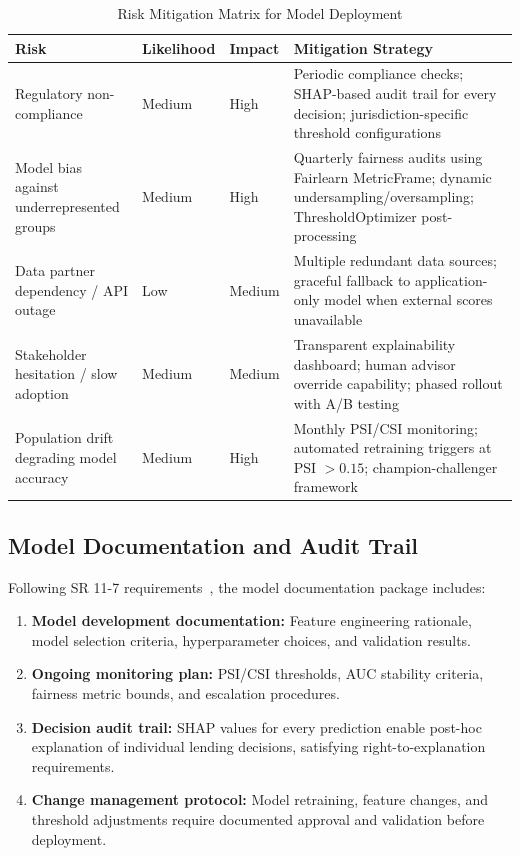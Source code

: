 \begin{table}[H]
\centering
\caption{Risk Mitigation Matrix for Model Deployment}
\label{tab:risk_mitigation}
\small
\setlength{\tabcolsep}{4pt}
\begin{tabular}{L{3.3cm}L{1.8cm}L{1.8cm}L{7.2cm}}
\toprule
\textbf{Risk} & \textbf{Likelihood} & \textbf{Impact} & \textbf{Mitigation Strategy} \\
\midrule
Regulatory non-compliance & Medium & High & Periodic compliance checks; SHAP-based audit trail for every decision; jurisdiction-specific threshold configurations \\
Model bias against underrepresented groups & Medium & High & Quarterly fairness audits using Fairlearn MetricFrame; dynamic undersampling/oversampling; ThresholdOptimizer post-processing \\
Data partner dependency / API outage & Low & Medium & Multiple redundant data sources; graceful fallback to application-only model when external scores unavailable \\
Stakeholder hesitation / slow adoption & Medium & Medium & Transparent explainability dashboard; human advisor override capability; phased rollout with A/B testing \\
Population drift degrading model accuracy & Medium & High & Monthly PSI/CSI monitoring; automated retraining triggers at PSI $> 0.15$; champion-challenger framework \\
\bottomrule
\end{tabular}
\end{table}

\subsection{Model Documentation and Audit Trail}

Following SR 11-7 requirements~\cite{occ2011}, the model documentation package includes:

\begin{enumerate}
    \item \textbf{Model development documentation:} Feature engineering rationale, model selection criteria, hyperparameter choices, and validation results.
    \item \textbf{Ongoing monitoring plan:} PSI/CSI thresholds, AUC stability criteria, fairness metric bounds, and escalation procedures.
    \item \textbf{Decision audit trail:} SHAP values for every prediction enable post-hoc explanation of individual lending decisions, satisfying right-to-explanation requirements.
    \item \textbf{Change management protocol:} Model retraining, feature changes, and threshold adjustments require documented approval and validation before deployment.
\end{enumerate}
